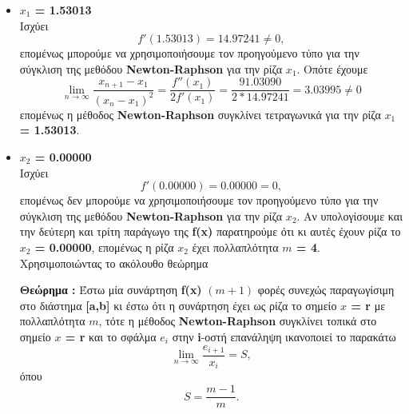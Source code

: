 \documentclass[First Project.tex]{subfiles}
\begin{document}
\begin{itemize}
        \item \textbf{$x_{1}$ = 1.53013} \\
            Ισχύει 
            \begin{equation*}
                f'( 1.53013 ) = 14.97241 \neq 0 ,
            \end{equation*}   
            επομένως μπορούμε να χρησιμοποιήσουμε τον προηγούμενο τύπο για την σύγκλιση της μεθόδου \textlatin{\textbf{Newton-Raphson}} για 
            την ρίζα \textlatin{\textbf{$x_{1}$}}. Οπότε έχουμε
            \begin{equation*}
                \lim_{n\to\infty} \frac{x_{n+1} - x_{1}}{(x_{n} - x_{1})^{2}} = \frac{f''(x_{1})}{2f'(x_{1})} = \frac{91.03090}{2 * 14.97241} = 3.03995 \neq 0
            \end{equation*}
            επομένως η μέθοδος \textlatin{\textbf{Newton-Raphson}} συγκλίνει τετραγωνικά για την ρίζα \textbf{$x_{1}$ = 1.53013}.
        \item \textbf{$x_{2}$ = 0.00000} \\
            Ισχύει 
            \begin{equation*}
                f'( 0.00000 ) = 0.00000= 0 ,
            \end{equation*}   
            επομένως δεν μπορούμε να χρησιμοποιήσουμε τον προηγούμενο τύπο για την σύγκλιση της μεθόδου \textlatin{\textbf{Newton-Raphson}} για 
            την ρίζα \textlatin{\textbf{$x_{2}$}}. Αν υπολογίσουμε και την δεύτερη και τρίτη παράγωγο της \textlatin{\textbf{f(x)}} παρατηρούμε ότι
            κι αυτές έχουν ρίζα το \textbf{$x_{2}$ = 0.00000}, επομένως η ρίζα \textbf{$x_{2}$} έχει πολλαπλότητα \textbf{$m$ = 4}. Χρησιμοποιώντας το 
            ακόλουθο θεώρημα 
            
            \large{\textbf{Θεώρημα : }} \normalsize Έστω μία συνάρτηση \textlatin{\textbf{f(x)}} $( m+1 )$ φορές συνεχώς παραγωγίσιμη στο διάστημα \textlatin{\textbf{[a,b]}} κι
            έστω ότι η συνάρτηση έχει ως ρίζα το σημείο \textbf{\textlatin{$x$ = r}} με πολλαπλότητα \textbf{$m$}, τότε η μέθοδος \textlatin{\textbf{Newton-Raphson}}
            συγκλίνει τοπικά στο σημείο \textbf{\textlatin{$x$ = r}} και το σφάλμα \textbf{\textlatin{$e_{i}$}} στην \textlatin{\textbf{i}}-οστή  
            επανάληψη ικανοποιεί το παρακάτω 
            \begin{equation*}
                \lim_{n\to\infty} \frac{e_{i+1}}{x_{i}} = S,     
            \end{equation*}
            όπου
            \begin{equation*}
                S = \frac{m-1}{m}.
            \end{equation*}


\end{itemize}
\end{document}

